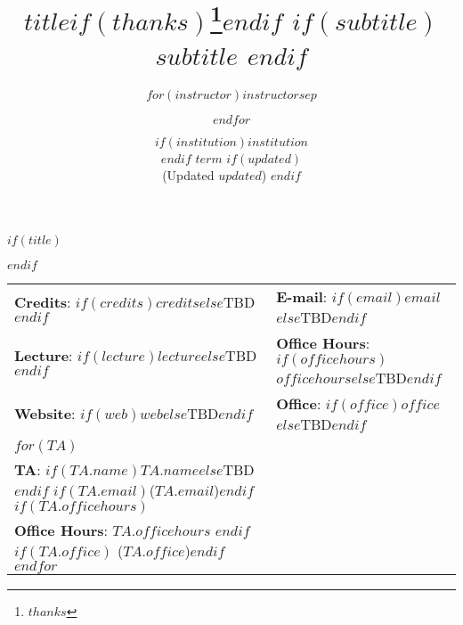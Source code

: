 \documentclass[
  $if(fontsize)$
    $fontsize$,
  $else$
    12pt,
  $endif$
  $if(lang)$
    $babel-lang$,
  $endif$
  $if(papersize)$
    $papersize$,
  $endif$
  $for(classoption)$
    $classoption$ $sep$,
  $endfor$]{article}
\title{$title$$if(thanks)$\thanks{$thanks$}$endif$
         $if(subtitle)$ 
         \\ $subtitle$
         $endif$ 
         }
\author{$for(instructor)$$instructor$$sep$ \and $endfor$}
\date{$if(institution)$$institution$\\$endif$
      $term$ 
      $if(updated)$ \\[6pt] \normalsize (Updated $updated$) $endif$}
\begin{document}
  

 $if(title)$
 \maketitle
 $endif$
 
 
\thispagestyle{firststyle}



\begin{tabular*}{\textwidth}{ @{\extracolsep{\fill}} ll @{\extracolsep{\fill}}}

  \textbf{Credits}: $if(credits)$$credits$$else$TBD$endif$ &
    \textbf{E-mail}: $if(email)$\texttt{$email$}$else$TBD$endif$ \\

  \textbf{Lecture}: $if(lecture)$$lecture$$else$TBD$endif$ &
    \textbf{Office Hours}: $if(officehours)$$officehours$$else$TBD$endif$ \\

  \textbf{Website}: $if(web)$\href{http://$web$}{\tt $web$}$else$TBD$endif$ &
    \textbf{Office}: $if(office)$$office$$else$TBD$endif$ \\

    

  $for(TA)$
    \\[3pt]
    \textbf{TA}: $if(TA.name)$$TA.name$$else$TBD $endif$
                 $if(TA.email)$(\texttt{$TA.email$})$endif$
                 $if(TA.officehours)$ \\ \textbf{Office Hours}: $TA.officehours$ $endif$
                 $if(TA.office)$ ($TA.office$)$endif$
  $endfor$


 \end{tabular*}
 
\vspace{2mm}

\end{document}
